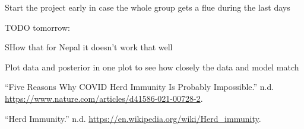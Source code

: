 \documentclass[
]{article}
\newlength{\cslhangindent}
\newlength{\cslentryspacingunit} %
\newenvironment{CSLReferences}[2] %
 {%
  \setlength{\parindent}{0pt}
  \ifodd #1
  \let\oldpar\par
  \def\par{\hangindent=\cslhangindent\oldpar}
  \fi
  \setlength{\parskip}{#2\cslentryspacingunit}
 }%
 {}
\begin{document}
Start the project early in case the whole group gets a flue during the
last days

TODO tomorrow:

SHow that for Nepal it doesn't work that well

Plot data and posterior in one plot to see how closely the data and
model match

\hypertarget{refs}{}
\begin{CSLReferences}{1}{0}
\leavevmode{}%
{``Five Reasons Why COVID Herd Immunity Is Probably Impossible.''} n.d.
\url{https://www.nature.com/articles/d41586-021-00728-2}.

\leavevmode{}%
{``Herd Immunity.''} n.d.
\url{https://en.wikipedia.org/wiki/Herd_immunity}.

\end{CSLReferences}
\end{document}

